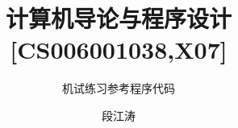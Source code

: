 \documentclass[graybox,envcountchap,sectrefs]{svmono}
\begin{document}
\author{段江涛}
\title{ 计算机导论与程序设计[CS006001038,X07]}
\subtitle{机试练习参考程序代码 }



\date{\zhtoday}

\maketitle  %



\tableofcontents   %



\begin{comment}
\end{comment}
\end{document}

